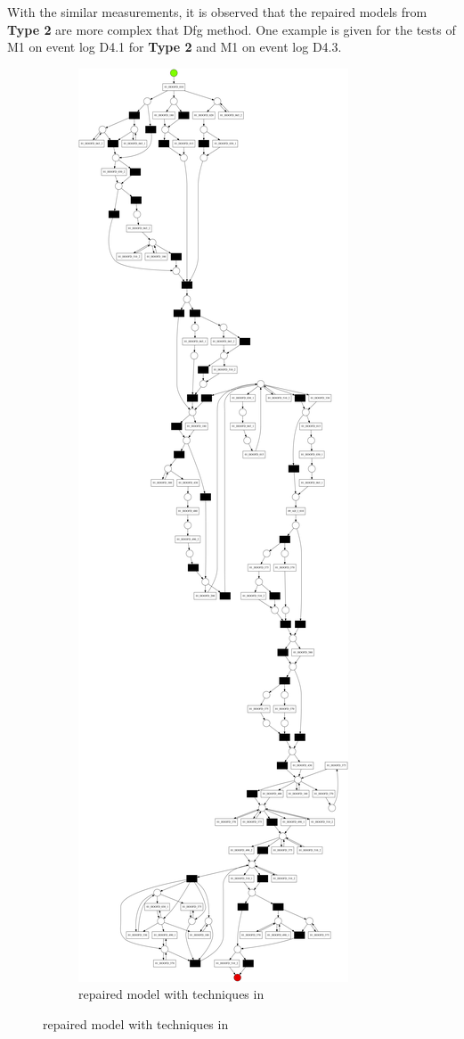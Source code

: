 With the similar measurements, it is observed that the repaired models from \textbf{Type 2} are more complex that Dfg method. One example is given for the tests of M1 on event log D4.1 for \textbf{Type 2} and M1 on event log D4.3. 
\begin{figure}[htp]
	\centering
	\begin{subfigure}[b]{0.48\textwidth}
		\centering
		\includegraphics[width=0.5\linewidth, height=0.7\textheight]{figures/evaluation/PN-result-D5-3-M1-fahland.pdf}
		\caption{repaired model with techniques in \cite{fahland2015model}}
		\label{fig:model_fahland}

\end{subfigure}
\end{figure}
